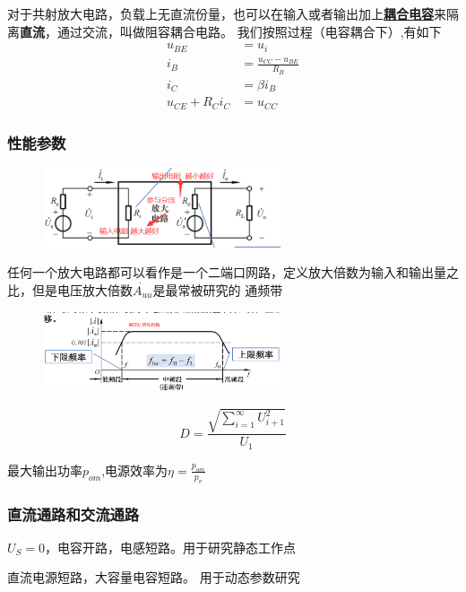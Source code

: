 对于共射放大电路，负载上无直流份量，也可以在输入或者输出加上\underline{\textbf{耦合电容}}来隔离\textbf{直流}，通过交流，叫做阻容耦合电路。
我们按照过程（电容耦合下）,有如下
\begin{align}
u_{BE}&=u_i \tag{3.1.a}\\
i_{B}&=\frac{u_{CC}-u_{BE}}{R_{B}} \tag{3.1.b}\\
i_{C}&=\beta i_{B} \tag{3.1.c}\\
u_{CE}+R_Ci_C&=u_{CC}    \tag{3.1.d}
\end{align}
\subsubsection{性能参数}
\begin{figure}[H]
    \includegraphics[width=7cm]{img/2.3.png}
    \end{figure}
    
任何一个放大电路都可以看作是一个二端口网路，定义放大倍数为输入和输出量之比，但是电压放大倍数$\dot{A_{uu}}$是最常被研究的
通频带
\begin{figure}[H]
        \includegraphics[width=7cm]{img/2.2.png}
        \end{figure}

\begin{definition}[非线性失真系数]
$$
D=\frac{\sqrt{\sum_{i=1}^{\infty}{U_{i+1}^2}}}{U_1}
$$
\end{definition}
最大输出功率$p_{om}$,电源效率为$\eta=\frac{p_{om}}{p_v}$
\subsubsection{直流通路和交流通路}
\begin{description}[leftmargin=1.7cm,style=nextline,nosep]%
    \item[直流通路] $U_S=0$，电容开路，电感短路。用于研究静态工作点
    \item[交流通路] 直流电源短路，大容量电容短路。  用于动态参数研究
\end{description}

